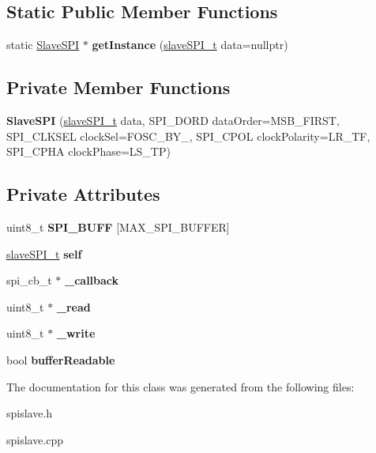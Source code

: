 \subsection*{Static Public Member Functions}
\begin{DoxyCompactItemize}
\item 
\mbox{\label{classSlaveSPI_af853e49df2daa8df562c211d4c01c825}} 
static \mbox{\hyperlink{classSlaveSPI}{Slave\+S\+PI}} $\ast$ {\bfseries get\+Instance} (\mbox{\hyperlink{structslaveSPI__t}{slave\+S\+P\+I\+\_\+t}} data=nullptr)
\end{DoxyCompactItemize}
\subsection*{Private Member Functions}
\begin{DoxyCompactItemize}
\item 
\mbox{\label{classSlaveSPI_a4e4d482325a3cdd0f626130ba351c402}} 
{\bfseries Slave\+S\+PI} (\mbox{\hyperlink{structslaveSPI__t}{slave\+S\+P\+I\+\_\+t}} data, S\+P\+I\+\_\+\+D\+O\+RD data\+Order=M\+S\+B\+\_\+\+F\+I\+R\+ST, S\+P\+I\+\_\+\+C\+L\+K\+S\+EL clock\+Sel=F\+O\+S\+C\+\_\+\+B\+Y\+\_, S\+P\+I\+\_\+\+C\+P\+OL clock\+Polarity=L\+R\+\_\+\+TF, S\+P\+I\+\_\+\+C\+P\+HA clock\+Phase=L\+S\+\_\+\+TP)
\end{DoxyCompactItemize}
\subsection*{Private Attributes}
\begin{DoxyCompactItemize}
\item 
\mbox{\label{classSlaveSPI_a6a33cdba141195a5a8157aed8dd39527}} 
uint8\+\_\+t {\bfseries S\+P\+I\+\_\+\+B\+U\+FF} \mbox{[}M\+A\+X\+\_\+\+S\+P\+I\+\_\+\+B\+U\+F\+F\+ER\mbox{]}
\item 
\mbox{\label{classSlaveSPI_a4c6a1758bdfcc6b7987aa8aaade47e57}} 
\mbox{\hyperlink{structslaveSPI__t}{slave\+S\+P\+I\+\_\+t}} {\bfseries self}
\item 
\mbox{\label{classSlaveSPI_adaf64cc08db2c73c7304d1ab9e6ef7c4}} 
spi\+\_\+cb\+\_\+t $\ast$ {\bfseries \+\_\+callback}
\item 
\mbox{\label{classSlaveSPI_ad9cf150323ece7a6f842d678b2aa1b79}} 
uint8\+\_\+t $\ast$ {\bfseries \+\_\+read}
\item 
\mbox{\label{classSlaveSPI_a7ce2f27aafe7c97bf92426aa79d7c4cf}} 
uint8\+\_\+t $\ast$ {\bfseries \+\_\+write}
\item 
\mbox{\label{classSlaveSPI_ab4d9e7eebaaead1f8dde9f933bfec2f1}} 
bool {\bfseries buffer\+Readable}
\end{DoxyCompactItemize}


The documentation for this class was generated from the following files\+:\begin{DoxyCompactItemize}
\item 
spislave.\+h\item 
spislave.\+cpp\end{DoxyCompactItemize}
